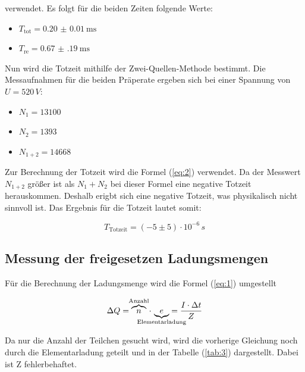 verwendet. Es folgt für die beiden Zeiten folgende Werte:

\begin{itemize}
  \item $T_\text{tot} = \SI{0.20(1)}{\milli\second}$
  \item $T_\text{re} = \SI{0.67(19)}{\milli\second}$
\end{itemize}

Nun wird die Totzeit mithilfe der Zwei-Quellen-Methode bestimmt.
Die Messaufnahmen für die beiden Präperate ergeben sich bei einer Spannung von $U = 520 \, V$:

\begin{itemize}
  \item $N_1 = 13100$
  \item $N_2 = 1393$
  \item $N_{1+2} = 14668$
\end{itemize}

Zur Berechnung der Totzeit wird die Formel (\ref{eq:2}) verwendet.
Da der Messwert $N_{1+2}$ größer ist als $N_1 + N_2$ bei dieser Formel eine
negative Totzeit herauskommen. Deshalb erigbt sich eine negative Totzeit, was
physikalisch nicht sinnvoll ist.
Das Ergebnis  für die Totzeit lautet somit:

\begin{equation*}
  T_{\text{Totzeit}} = (-5 \pm 5) \cdot 10^{-6} \, s
\end{equation*}


\subsection{Messung der freigesetzen Ladungsmengen}

Für die Berechnung der Ladungsmenge wird die Formel (\ref{eq:1}) umgestellt

\begin{equation*}
  \Delta Q =\overbrace{n}^{\mathclap{\text{Anzahl}}} \, \cdot \, \underbrace{e}_{\mathclap{\text{Elementarladung}}}  =  \frac{I \cdot \Delta t}{Z}
\end{equation*}

Da nur die Anzahl der Teilchen gesucht wird, wird die vorherige Gleichung noch durch die Elementarladung geteilt und in der Tabelle (\ref{tab:3})
dargestellt. Dabei ist Z fehlerbehaftet.

